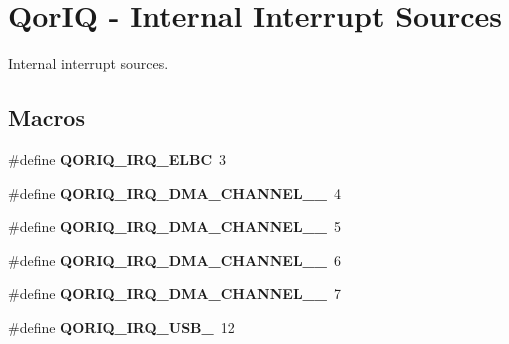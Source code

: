 \hypertarget{group__QoriqInterruptAll}{}\section{Qor\+IQ -\/ Internal Interrupt Sources}
\label{group__QoriqInterruptAll}


Internal interrupt sources.  


\subsection*{Macros}
\begin{DoxyCompactItemize}
\item 
\mbox{\label{group__QoriqInterruptAll_gae26483d5d5286e27ee887431eecb1546}} 
\#define {\bfseries Q\+O\+R\+I\+Q\+\_\+\+I\+R\+Q\+\_\+\+E\+L\+BC}~3
\item 
\mbox{\label{group__QoriqInterruptAll_ga1f17b51d74c73dad23b949770be60c6e}} 
\#define {\bfseries Q\+O\+R\+I\+Q\+\_\+\+I\+R\+Q\+\_\+\+D\+M\+A\+\_\+\+C\+H\+A\+N\+N\+E\+L\+\_\+\_}~4
\item 
\mbox{\label{group__QoriqInterruptAll_ga3e94a35ef5b2694a1f7b69f62bb32087}} 
\#define {\bfseries Q\+O\+R\+I\+Q\+\_\+\+I\+R\+Q\+\_\+\+D\+M\+A\+\_\+\+C\+H\+A\+N\+N\+E\+L\+\_\+\_}~5
\item 
\mbox{\label{group__QoriqInterruptAll_gaf4bce74a01247c84fc8546f490998245}} 
\#define {\bfseries Q\+O\+R\+I\+Q\+\_\+\+I\+R\+Q\+\_\+\+D\+M\+A\+\_\+\+C\+H\+A\+N\+N\+E\+L\+\_\+\_}~6
\item 
\mbox{\label{group__QoriqInterruptAll_ga45aabc5101b0225785509899276c52a8}} 
\#define {\bfseries Q\+O\+R\+I\+Q\+\_\+\+I\+R\+Q\+\_\+\+D\+M\+A\+\_\+\+C\+H\+A\+N\+N\+E\+L\+\_\+\_}~7
\item 
\mbox{\label{group__QoriqInterruptAll_ga23c98c6764f94f859afb0e9a9ca14253}} 
\#define {\bfseries Q\+O\+R\+I\+Q\+\_\+\+I\+R\+Q\+\_\+\+U\+S\+B\+\_}~12
\item 
\mbox{\label{group__QoriqInterruptAll_gafddd6840bd333daffbf725a2847019ef}} 

\end{DoxyCompactItemize}
